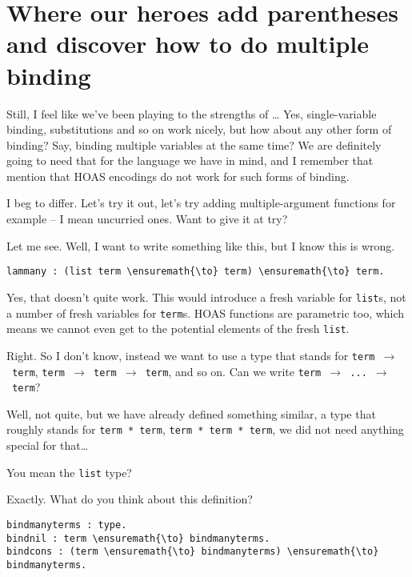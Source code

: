 \section{Where our heroes add parentheses and discover how to do
multiple
binding}\label{where-our-heroes-add-parentheses-and-discover-how-to-do-multiple-binding}

\heroSTUDENT{} Still, I feel like we've been playing to the strengths of
\lamprolog\ldots{} Yes, single-variable binding, substitutions and so on
work nicely, but how about any other form of binding? Say, binding
multiple variables at the same time? We are definitely going to need
that for the language we have in mind, and I remember that
\citet{keuchel2016needle} mention that HOAS encodings do not work for
such forms of binding.

\heroADVISOR{} I beg to differ. Let's try it out, let's try adding
multiple-argument functions for example -- I mean uncurried ones. Want
to give it at try?

\heroSTUDENT{} Let me see. Well, I want to write something like this, but I
know this is wrong.

\begin{verbatim}
lammany : (list term \ensuremath{\to} term) \ensuremath{\to} term.
\end{verbatim}

\heroADVISOR{} Yes, that doesn't quite work. This would introduce a fresh
variable for \texttt{list}s, not a number of fresh variables for
\texttt{term}s. HOAS functions are parametric too, which means we cannot
even get to the potential elements of the fresh \texttt{list}.

\heroSTUDENT{} Right. So I don't know, instead we want to use a type that
stands for \texttt{term\ \ensuremath{\to}\ term},
\texttt{term\ \ensuremath{\to}\ term\ \ensuremath{\to}\ term}, and so on.
Can we write \texttt{term\ \ensuremath{\to}\ ...\ \ensuremath{\to}\ term}?

\heroADVISOR{} Well, not quite, but we have already defined something similar,
a type that roughly stands for \texttt{term\ *\ term},
\texttt{term\ *\ term\ *\ term}, we did not need anything special for
that\ldots{}

\heroSTUDENT{} You mean the \texttt{list} type?

\heroADVISOR{} Exactly. What do you think about this definition?

\begin{verbatim}
bindmanyterms : type.
bindnil : term \ensuremath{\to} bindmanyterms.
bindcons : (term \ensuremath{\to} bindmanyterms) \ensuremath{\to} bindmanyterms.
\end{verbatim}

